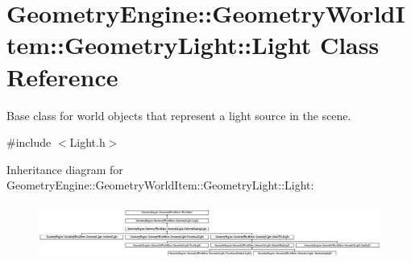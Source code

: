 \hypertarget{class_geometry_engine_1_1_geometry_world_item_1_1_geometry_light_1_1_light}{}\section{Geometry\+Engine\+::Geometry\+World\+Item\+::Geometry\+Light\+::Light Class Reference}
\label{class_geometry_engine_1_1_geometry_world_item_1_1_geometry_light_1_1_light}


Base class for world objects that represent a light source in the scene.  




{\ttfamily \#include $<$Light.\+h$>$}

Inheritance diagram for Geometry\+Engine\+::Geometry\+World\+Item\+::Geometry\+Light\+::Light\+:\begin{figure}[H]
\begin{center}
\leavevmode
\includegraphics[height=1.850220cm]{class_geometry_engine_1_1_geometry_world_item_1_1_geometry_light_1_1_light}
\end{center}
\end{figure}

